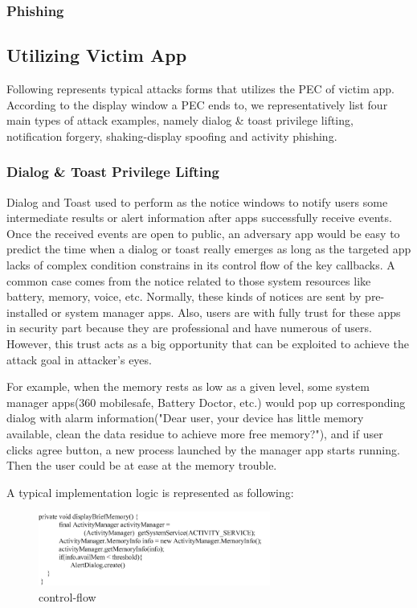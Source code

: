 \documentclass{sig-alternate-05-2015}
\begin{document}
\subsubsection{Phishing}

\subsection{Utilizing Victim App}

Following represents typical attacks forms that utilizes the PEC of victim app. According to the display window a PEC ends to, we representatively list four main types of attack examples, namely dialog \& toast privilege lifting, notification forgery, shaking-display spoofing and activity phishing. 
\subsubsection{Dialog \& Toast Privilege Lifting}
Dialog and Toast used to perform as the notice windows to notify users some intermediate results or alert information  after apps successfully receive events. Once the received events are open to public, an adversary app would be easy to predict the time when a dialog or toast really emerges as long as the targeted app lacks of complex condition constrains in its control flow of the key callbacks. A common case comes from the notice related to those system resources like battery, memory, voice, etc. Normally, these kinds of notices are sent by pre-installed or system manager apps. Also, users are with fully trust for these apps in security part because they are professional and have numerous of users. However, this trust acts as a big opportunity that can be exploited to achieve the attack goal in attacker's eyes.

For example, when the memory rests as low as a given level, some system manager apps(360 mobilesafe, Battery Doctor, etc.) would pop up corresponding dialog with alarm information("Dear user, your device has little memory available, clean the data residue to achieve more free memory?"), and if user clicks agree button, a new process launched by the manager app starts running. Then the user could be at ease at the memory trouble.

A typical implementation logic is represented as following:

\begin{figure}
\centering
\includegraphics[width = 3.0in]{code1.png}
\caption{\label{}control-flow}
\end{figure}
\end{document}
